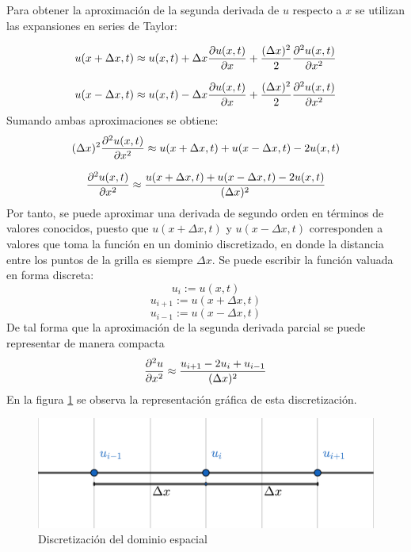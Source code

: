 \documentclass[12pt]{article}
\begin{document}
	Para obtener la aproximación de la segunda derivada de $u$ respecto a $x$ se utilizan las expansiones en series de Taylor:

	\begin{equation}
		u(x + \Delta x,t) \approx u(x,t) + \Delta x\pdv{u(x,t)}{x} + \frac{(\Delta x)^{2}}{2}\pdv{^{2}u(x,t)}{x^2} 
	\end{equation}

	\begin{equation}
		u(x - \Delta x,t) \approx u(x,t) - \Delta x\pdv{u(x,t)}{x}+\frac{(\Delta x)^{2}}{2}\pdv{^{2}u(x,t)}{x^2} 
	\end{equation}
	Sumando ambas aproximaciones se obtiene:
	\begin{equation}
		(\Delta x)^2 \pdv{^{2}u(x,t)}{x^2}\approx u(x + \Delta x,t) + u(x - \Delta x,t) - 2 u(x,t)
	\end{equation}

	\begin{equation}
		\pdv{^{2}u(x,t)}{x^2}\approx \frac{u(x + \Delta x,t) + u(x - \Delta x,t) - 2 u(x,t)}{(\Delta x)^2}
	\end{equation}
	Por tanto, se puede aproximar una derivada de segundo orden en términos de valores conocidos, puesto que $u(x + \Delta x,t)$ y $u(x - \Delta x,t)$ corresponden a valores que toma la función en un dominio discretizado, en donde la distancia entre los puntos de la grilla es siempre $\Delta x$. Se puede escribir la función valuada en forma discreta:
	\[u_{i} := u(x,t)\]
	\[u_{i+1} := u(x + \Delta x,t)\]
	\[u_{i-1} := u(x - \Delta x,t)\]
	De tal forma que la aproximación de la segunda derivada parcial se puede representar de manera compacta
	\begin{equation}
		\pdv{^{2}u}{x^2} \approx \frac{u_{i+1}-2u_{i}+u_{i-1}}{(\Delta x)^{2}}
		\label{eq:segunda-derivada-discreta}
	\end{equation}
	En la figura \ref{fig:discretizacion} se observa la representación gráfica de esta discretización.
	
	\begin{figure}[ht]
		\centering
		\includegraphics[scale=0.8]{images/grilla.pdf}
		\caption{Discretización del dominio espacial}
		\label{fig:discretizacion}
	\end{figure}
	
\end{document}
